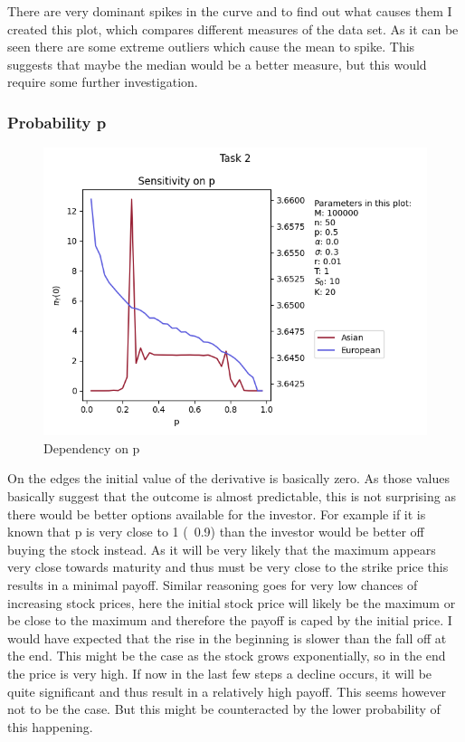 There are very dominant spikes in the curve and to find out what causes them I created this plot, which compares different measures of the data set. As it can be seen there are some extreme outliers which cause the mean to spike. This suggests that maybe the median would be a better measure, but this would require some further investigation.

\newpage
\subsubsection{Probability p}
\begin{figure}[!h]
    \centering
    \includegraphics[width=0.7\linewidth]{pictures/task2_p.png}
    \caption{Dependency on p}
    \label{fig:task2_p}
\end{figure}

On the edges the initial value of the derivative is basically zero. As those values basically suggest that the outcome is almost predictable, this is not surprising as there would be better options available for the investor. For example if it is known that p is very close to 1 (~0.9) than the investor would be better off buying the stock instead. As it will be very likely that the maximum appears very close towards maturity and thus must be very close to the strike price this results in a minimal payoff.
Similar reasoning goes for very low chances of increasing stock prices, here the initial stock price will likely be the maximum or be close to the maximum and therefore the payoff is caped by the initial price.
I would have expected that the rise in the beginning is slower than the fall off at the end. This might be the case as the stock grows exponentially, so in the end the price is very high. If now in the last few steps a decline occurs, it will be quite significant and thus result in a relatively high payoff. This seems however not to be the case. But this might be counteracted by the lower probability of this happening.

